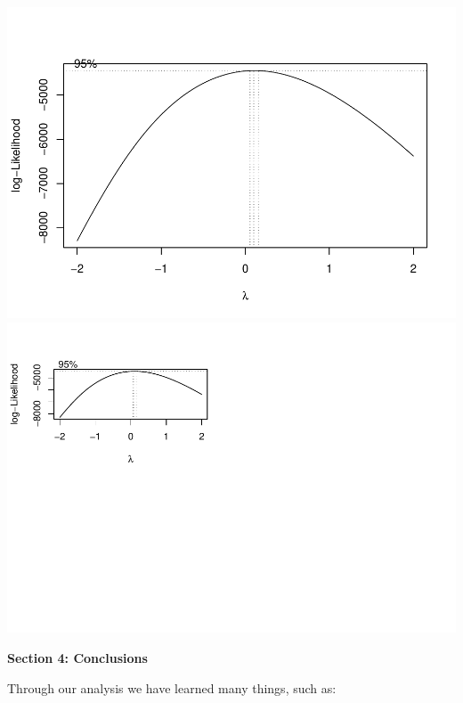 \documentclass[
]{article}
\begin{document}
\includegraphics{Final_Project_2_files/figure-latex/unnamed-chunk-17-1.pdf}
\includegraphics{Final_Project_2_files/figure-latex/unnamed-chunk-17-2.pdf}

\textbf{Section 4: Conclusions}

Through our analysis we have learned many things, such as:
\end{document}
